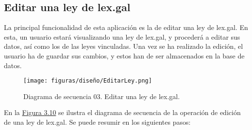 \subsection{Editar una ley de lex.gal}

La principal funcionalidad de esta aplicación es la de editar una ley de lex.gal. En esta, un usuario estará visualizando una ley de lex.gal, y procederá a editar sus datos, así como los de las leyes vinculadas. Una vez se ha realizado la edición, el usuario ha de guardar sus cambios, y estos han de ser almacenados en la base de datos.

\begin{figure}[H]
\centerline{\texttt{[image: figuras/diseño/EditarLey.png]}}
\caption{Diagrama de secuencia 03. Editar una ley de lex.gal.}
\label{enlaceDEditar}
\end{figure}

En la \hyperref[enlaceDRegistro]{Figura 3.10} se ilustra el diagrama de secuencia de la operación de edición de una ley de lex.gal. Se puede resumir en los siguientes pasos:

